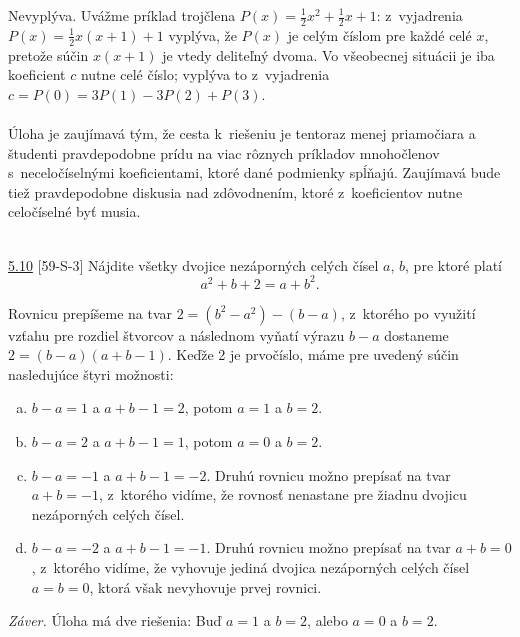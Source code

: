 \rieh Nevyplýva. Uvážme príklad trojčlena $P (x) =\frac{1}{2}x^2+\frac{1}{2}x+1$: z~vyjadrenia $P (x) =\frac{1}{2}x(x + 1) + 1$ vyplýva, že $P (x)$ je celým číslom pre každé celé $x$, pretože súčin $x(x + 1)$ je vtedy deliteľný dvoma. Vo všeobecnej situácii je iba koeficient $c$ nutne celé číslo; vyplýva to z~vyjadrenia $c = P (0) = 3P (1) - 3P (2) + P (3)$.\\
\\
\kom Úloha je zaujímavá tým, že cesta k~riešeniu je tentoraz menej priamočiara a študenti pravdepodobne prídu na viac rôznych príkladov mnohočlenov s~neceločíselnými koeficientami, ktoré dané podmienky spĺňajú. Zaujímavá bude tiež pravdepodobne diskusia nad zdôvodnením, ktoré z~koeficientov nutne celočíselné byť musia.\\
\\
\begin{tcolorbox}[breakable,notitle,boxrule=0pt,colback=light-gray,colframe=light-gray]\ul{5.10} [59-S-3] Nájdite všetky dvojice nezáporných celých čísel $a$, $b$, pre ktoré platí
$$a^2 + b + 2 = a + b^2.$$

\end{tcolorbox}

\rieh Rovnicu prepíšeme na tvar $2 = (b^2 -a^2 )-(b-a)$, z~ktorého po využití vzťahu pre rozdiel štvorcov a následnom vyňatí výrazu $b - a$ dostaneme $2 = (b - a)(a + b - 1)$.
Keďže 2 je prvočíslo, máme pre uvedený súčin nasledujúce štyri možnosti:

\begin{enumerate}[a)]
\item $b - a = 1$ a $a + b - 1 = 2$, potom $a = 1$ a $b = 2.$
\item  $b - a = 2$ a $a + b - 1 = 1$, potom $a = 0$ a $b = 2$.
\item $b - a = -1$ a $a + b - 1 = -2$. Druhú rovnicu možno prepísať na tvar $a + b = -1$, z~ktorého vidíme, že rovnosť nenastane pre žiadnu dvojicu nezáporných celých čísel.
\item  $b - a = -2$ a $a + b - 1 = -1$. Druhú rovnicu možno prepísať na tvar $a + b = 0$, z~ktorého vidíme, že vyhovuje jediná dvojica nezáporných celých čísel $a = b = 0$, ktorá však nevyhovuje prvej rovnici.
\end{enumerate}

\textit{Záver.} Úloha má dve riešenia: Buď $a = 1$ a $b = 2$, alebo $a = 0$ a $b = 2$.

